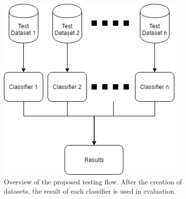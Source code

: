 \begin{figure}[!h]
    \begin{center}
        \includegraphics[width=0.5\linewidth]{images/architectures-test.png}
    \end{center}
    \caption{%
        Overview of the proposed testing flow. After the creation of datasets, the result of each classifier is used in evaluation.%
    }\label{figure:test-flow}
    \vspace{4ex}
\end{figure}
